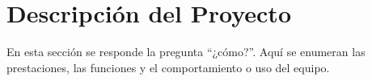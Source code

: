 \section{Descripción del Proyecto}
\color{blue}En esta sección se responde la pregunta “¿cómo?”. Aquí se enumeran las prestaciones, las funciones y el comportamiento o uso del equipo.\\ \color{black}
    
